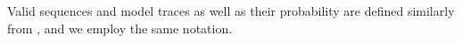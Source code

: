 Valid sequences and model traces as well as their probability are defined similarly from , and we employ the same notation. %




